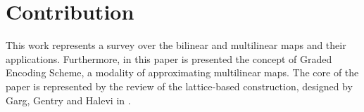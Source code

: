 \section{Contribution}

This work represents a survey over the bilinear and multilinear maps and their applications. Furthermore, in this paper is presented the concept of Graded Encoding Scheme, a modality of approximating multilinear maps. The core of the paper is represented by the review of the lattice-based construction, designed by Garg, Gentry and Halevi in \cite{GGH13}. 